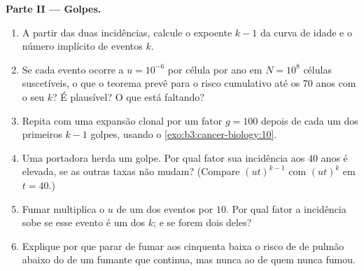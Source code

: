 \begin{problem}
\medskip
\noindent\textbf{Parte II --- Golpes.}
\begin{enumerate}[resume]
  \item A partir das duas incidências, calcule o expoente $k - 1$ da
        curva de idade e o número implícito de eventos $k$.
  \item Se cada evento ocorre a $u = 10^{-6}$ por célula por ano em
        $N = 10^{8}$ células suscetíveis, o que o teorema prevê para o
        risco cumulativo até os $70$ anos com o seu $k$? É plausível? O
        que está faltando?
  \item Repita com uma expansão clonal por um fator $g = 100$ depois de
        cada um dos primeiros $k - 1$ golpes, usando o
        \cref{exo:b3:cancer-biology:10}.
  \item Uma portadora herda um golpe. Por qual fator sua incidência aos
        $40$ anos é elevada, se as outras taxas não mudam? (Compare
        $(ut)^{k-1}$ com $(ut)^{k}$ em $t = 40$.)
  \item Fumar multiplica o $u$ de um dos eventos por $10$. Por qual
        fator a incidência sobe se esse evento é um dos $k$; e se forem
        dois deles?
  \item Explique por que parar de fumar aos cinquenta baixa o risco de
         de pulmão abaixo do de um fumante que continua, mas
        nunca ao de quem nunca fumou.
\end{enumerate}


\end{problem}
